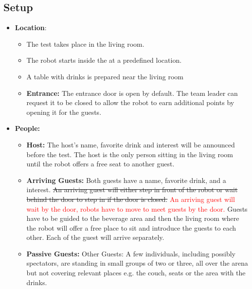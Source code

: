 \subsection*{Setup}
\begin{itemize}
	\item \textbf{Location}: 
	\begin{itemize}
	\item The test takes place in the living room.	
	\item The robot starts inside the \Arena{} at a predefined location.
	\item A table with drinks is prepared near the living room
	\item \textbf{Entrance:} The entrance door is open by default. The team leader can request it to be closed to allow the robot to earn additional points by opening it for the guests.
	\end{itemize}
	
	\item \textbf{People:} 
	\begin{itemize}
	\item \textbf{Host:} The host's name, favorite drink and interest will be announced before the test. The host is the only person sitting in the living room until the robot offers a free seat to another guest.
	\item \textbf{Arriving Guests:} Both guests have a name, favorite drink, and a interest. \sout{An arriving guest will either step in front of the robot or wait behind the door to step in if the door is closed.} \textcolor{red}{An arriving guest will wait by the door, robots have to move to meet guests by the door.} Guests have to be guided to the beverage area and then the living room where the robot will offer a free place to sit and introduce the guests to each other. Each of the guest will arrive separately. 
	\item \textbf{Passive Guests:} Other Guests: A few individuals, including possibly spectators, are standing in small groups of two or three, all over the arena but not covering relevant places e.g. the couch, seats or the area with the drinks.
	\end{itemize}

\end{itemize}

